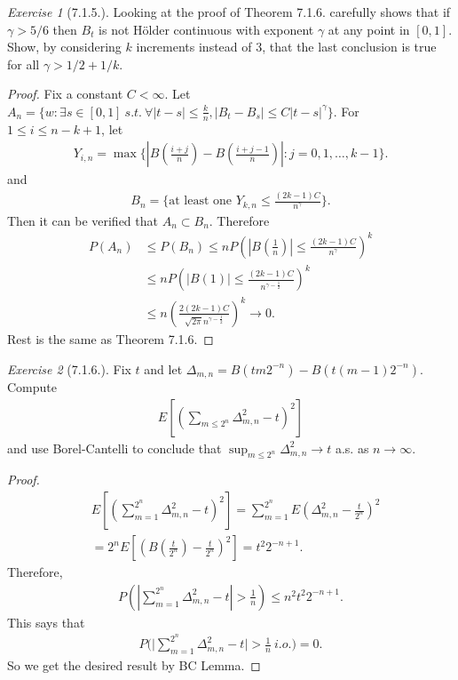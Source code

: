 \documentclass[12pt,a4paper]{amsart}
\theoremstyle{plain}
\theoremstyle{definition}
\theoremstyle{remark}
\newtheorem*{exe}{Exercise}
\numberwithin{equation}{section}
\begin{document}
\begin{exe}[7.1.5.]
Looking at the proof of Theorem 7.1.6. carefully shows that if $\gamma > 5/6$ then $B_t$ is not H\"{o}lder continuous with exponent $\gamma$ at any point in $[0,1]$. 
Show, by considering $k$ increments instead of $3$, that the last conclusion is true for all $\gamma > 1/2 + 1/k$.
\end{exe}
\begin{proof}
Fix a constant $C < \infty$.
Let $A_n = \{w: \exists s \in [0,1]~s.t.~ \forall |t-s|\leq \frac{k}{n}, |B_t - B_s| \leq C |t-s|^\gamma\}$.
For $1 \leq i \leq n - k + 1$, let 
\begin{align}
Y_{i,n} = \max\{|B(\frac{i+j}{n}) - B(\frac{i+j-1}{n})|: j = 0,1,\dots,k - 1\}.
\end{align}
and
\begin{align}
B_n = \{\text{at least one } Y_{k,n} \leq \frac{(2k - 1)C}{ n^{\gamma}}\}.
\end{align}
Then it can be verified that $A_n \subset B_n$.
Therefore
\begin{align}
P(A_n) &\leq P(B_n)
  \leq n P\left( |B(\frac{1}{n})| \leq \frac{(2k - 1) C}{n^{\gamma}} \right)^k
\\& \leq n P(|B(1)|\leq \frac{(2k - 1) C}{n^{\gamma - \frac{1}{2}}})^k
  \\& \leq n \left( \frac{2(2k-1) C}{ \sqrt{2\pi} n^{\gamma - \frac{1}{2}}} \right)^k 
\to 0.
\end{align}
Rest is the same as Theorem 7.1.6.
\end{proof}
\begin{exe}[7.1.6.]
Fix $t$ and let $\Delta_{m,n} = B(tm2^{-n}) - B(t(m-1)2^{-n})$.
Compute
\begin{align}
  E\left[ \left( \sum_{m \leq 2^n} \Delta^2_{m,n} - t \right)^2 \right]
\end{align}
 and use Borel-Cantelli to conclude that $\sup_{m \leq 2^n} \Delta_{m,n}^2 \to t$ a.s. as $n \to \infty$. 
\end{exe}
\begin{proof}
\begin{align}
  &E\left[\left( \sum_{m=1}^{2^n} \Delta_{m,n}^2 - t \right)^2\right]
    = \sum_{m = 1}^{2^n} E\left( \Delta_{m,n}^2 - \frac{t}{2^n} \right)^2
\\& = 2^n E\left[\left(B(\frac{t}{2^n}) - \frac{t}{2^n}\right)^2\right] = t^2 2^{-n +1}.
\end{align}
Therefore,
\begin{align}
  P\left( \left| \sum_{m=1}^{2^n} \Delta_{m,n}^2 - t \right| > \frac{1}{n} \right)
\leq n^2 t^2 2^{-n +1}.
\end{align}
This says that 
\begin{align}
P\Big( \Big| \sum_{m = 1}^{2^n} \Delta_{m,n}^2 - t \Big| > \frac{1}{n}~i.o.  \Big) = 0.
\end{align}
So we get the desired result by BC Lemma.
\end{proof}
\end{document}
